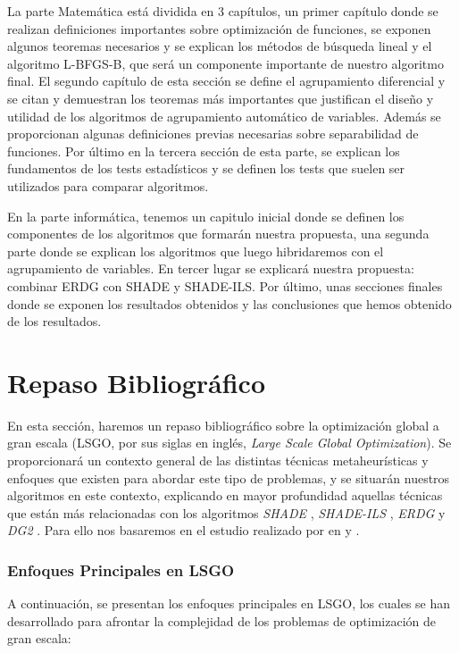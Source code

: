 La parte Matemática está dividida en 3 capítulos, un primer capítulo donde se realizan definiciones importantes sobre optimización de funciones, se exponen algunos teoremas necesarios y se explican los métodos de búsqueda lineal y el algoritmo L-BFGS-B, que será un componente importante de nuestro algoritmo final. El segundo capítulo de esta sección se define el agrupamiento diferencial y se citan y demuestran los teoremas más importantes que justifican el diseño y utilidad de los algoritmos de agrupamiento automático de variables. Además se proporcionan algunas definiciones previas necesarias sobre separabilidad de funciones. Por último en la tercera sección de esta parte, se explican los fundamentos de los tests estadísticos y se definen los tests que suelen ser utilizados para comparar algoritmos. 

En la parte informática, tenemos un capitulo inicial donde se definen los componentes de los algoritmos que formarán nuestra propuesta, una segunda parte donde se explican los algoritmos que luego hibridaremos con el agrupamiento de variables. En tercer lugar se explicará nuestra propuesta: combinar ERDG con SHADE y SHADE-ILS. Por último, unas secciones finales donde se exponen los resultados obtenidos y las conclusiones que hemos obtenido de los resultados.

\chapter{Repaso Bibliográfico}

En esta sección, haremos un repaso bibliográfico sobre la optimización global a gran escala (LSGO, por sus siglas en inglés, \textit{Large Scale Global Optimization}). Se proporcionará un contexto general de las distintas técnicas metaheurísticas y enfoques que existen para abordar este tipo de problemas, y se situarán nuestros algoritmos en este contexto, explicando en mayor profundidad aquellas técnicas que están más relacionadas con los algoritmos \textit{SHADE} \cite{TanabeShade}, \textit{SHADE-ILS} \citep{Molina2018}, \textit{ERDG} \cite{ERDG} y \textit{DG2} \cite{DG2}. Para ello nos basaremos en el estudio realizado por \citeauthor{Review_I} en \cite{Review_I} y \cite{Review_II}.

\subsection{Enfoques Principales en LSGO}

A continuación, se presentan los enfoques principales en LSGO, los cuales se han desarrollado para afrontar la complejidad de los problemas de optimización de gran escala:

